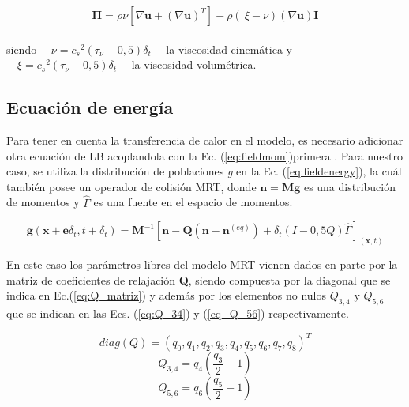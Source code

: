 \begin{equation}
	\mathbf{\Pi} = \rho \nu \left[	\nabla \mathbf{u} + {\left(\nabla \mathbf{u}\right)}^{T}\right] + \rho \left(\ \xi - \nu \right) \left( \nabla \mathbf{u}\right) \mathbf{I}
\end{equation}
\\
siendo $\quad\nu = {c_{s}}^{2} (\tau_{\nu}- 0,5) \delta_{t}\quad$ la viscosidad cinemática y $\quad\xi = {c_{s}}^{2} (\tau_{\nu}- 0,5) \delta_{t}\quad$ la viscosidad volumétrica.



\subsection{Ecuación de energía}

Para tener en cuenta la transferencia de calor en el modelo, es necesario adicionar otra ecuación de LB acoplandola con la Ec. (\ref{eq:fieldmom})primera \cite{li2013lattice}. Para nuestro caso, se utiliza la distribución de poblaciones \textit{g} en la Ec. (\ref{eq:fieldenergy}), la cuál también posee un operador de colisión MRT, donde $\mathbf{n} = \mathbf{M} \mathbf{g}$ es una distribución de momentos y $\hat{\Gamma}$ es una fuente en el espacio de momentos.


\begin{equation}
    \mathbf{g}(\mathbf{x} + \mathbf{e} \delta_{t} ,t + \delta_{t}) = \mathbf{M}^{-1} \left[ \mathbf{n} - \mathbf{Q}(\mathbf{n} - \mathbf{n}^{(eq)}) + \delta_{t} \left( I - 0,5 Q \right) \hat{\Gamma}  \right]_{(\mathbf{x},t)}
    \label{eq:fieldenergy}
\end{equation}

En este caso los parámetros libres del modelo MRT vienen dados en parte por la matriz de coeficientes de relajación \textbf{Q}, siendo compuesta por la diagonal que se indica en Ec.(\ref{eq:Q_matriz}) y además por los elementos no nulos $Q_{3,4}$ y $ Q_{5,6}$ que se indican en las Ecs. (\ref{eq:Q_34}) y (\ref{eq_Q_56})  respectivamente.

\begin{equation}
    \textit{diag} (Q) = {( q_{0} , q_{1} , q_{2} , q_{3} , q_{4} , q_{5} , q_{6} , q_{7} , q_{8} )}^{T}
    \label{eq:Q_matriz}
\end{equation}
\begin{equation}
    Q_{3,4} = q_{4} \left( \frac{q_{3}}{2} - 1 \right)
    \label{eq:Q_34}
\end{equation}
\begin{equation}
    Q_{5,6} = q_{6} \left( \frac{q_{5}}{2} - 1 \right)
    \label{eq_Q_56}
\end{equation}

